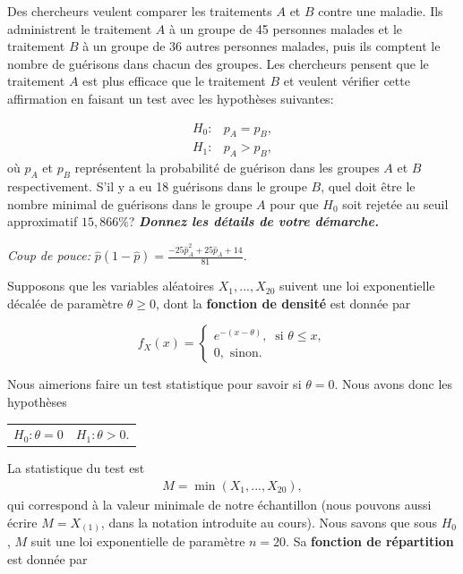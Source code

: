 \begin{questions}
\newpage 



\question[10] Des chercheurs veulent comparer les traitements $A$ et $B$ contre une maladie.
Ils administrent le traitement $A$ à un groupe de 45 personnes malades et le traitement $B$ à un groupe de 36 autres personnes malades, puis ils comptent le nombre de guérisons dans chacun des groupes.
Les chercheurs pensent que le traitement $A$ est plus efficace que le traitement $B$ et veulent vérifier cette affirmation en faisant un test avec les hypothèses suivantes:

\begin{align*}
    H_0:&p_A=p_B,\\
    H_1:&p_A>p_B,
\end{align*}
où $p_A$ et $p_B$ représentent la probabilité de guérison dans les groupes $A$ et $B$ respectivement.
S'il y a eu 18 guérisons dans le groupe $B$, quel doit être le nombre minimal de guérisons dans le groupe $A$ pour que $H_0$ soit rejetée au seuil approximatif $15,866\%$? \textbf{\textit{Donnez les détails de votre démarche.}}

\vspace{0.5cm}

\textit{Coup de pouce:} $\displaystyle \hat{p}(1-\hat{p})=\frac{-25 \hat{p}_A^2+25 \hat{p}_A+14}{81}$.
\newpage


\question Supposons que les variables aléatoires $X_1,...,X_{20}$ suivent une loi exponentielle décalée de paramètre $\theta \geq0 $, dont la \textbf{fonction de densité} est donnée par 

 \begin{equation*}
  f_X(x) = \begin{cases}
         e^{-(x-\theta)},\ \text{  si  } \theta \leq x , \\
        0, \text{ sinon.}
        \end{cases}
 \end{equation*}

Nous aimerions faire un test statistique pour savoir si $\theta=0$. Nous avons donc les hypothèses

\begin{table}[ht]
    \centering
    \begin{tabular}{cc}
         $H_0: \theta=0$ & $H_1: \theta > 0$.
    \end{tabular}
\end{table}
La statistique du test est
\begin{align*}
    M=\min (X_1,...,X_{20}),
\end{align*}
qui correspond à la valeur minimale de notre échantillon (nous pouvons aussi écrire $M=X_{(1)}$, dans la notation introduite au cours).
Nous savons que sous $H_0$, $M$ suit une loi exponentielle de paramètre $n=20$. Sa \textbf{fonction de répartition} est donnée par 


\end{questions}
